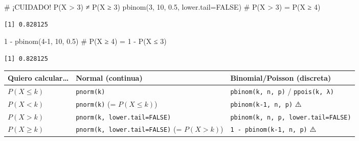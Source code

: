 \documentclass[
  letterpaper,
  DIV=11,
  numbers=noendperiod]{scrartcl}
\newenvironment{Shaded}{\begin{snugshade}}{\end{snugshade}}
\newcommand{\AttributeTok}[1]{\textcolor[rgb]{0.40,0.45,0.13}{#1}}
\newcommand{\CommentTok}[1]{\textcolor[rgb]{0.37,0.37,0.37}{#1}}
\newcommand{\ConstantTok}[1]{\textcolor[rgb]{0.56,0.35,0.01}{#1}}
\newcommand{\DecValTok}[1]{\textcolor[rgb]{0.68,0.00,0.00}{#1}}
\newcommand{\FloatTok}[1]{\textcolor[rgb]{0.68,0.00,0.00}{#1}}
\newcommand{\FunctionTok}[1]{\textcolor[rgb]{0.28,0.35,0.67}{#1}}
\newcommand{\NormalTok}[1]{\textcolor[rgb]{0.00,0.23,0.31}{#1}}
\newcommand{\SpecialCharTok}[1]{\textcolor[rgb]{0.37,0.37,0.37}{#1}}
\newcounter{none} %
\begin{document}
\begin{Shaded}
\begin{Highlighting}[]
\CommentTok{\# ¡CUIDADO! P(X \textgreater{} 3) ≠ P(X ≥ 3)}
\FunctionTok{pbinom}\NormalTok{(}\DecValTok{3}\NormalTok{, }\DecValTok{10}\NormalTok{, }\FloatTok{0.5}\NormalTok{, }\AttributeTok{lower.tail=}\ConstantTok{FALSE}\NormalTok{)  }\CommentTok{\# P(X \textgreater{} 3) = P(X ≥ 4)}
\end{Highlighting}
\end{Shaded}

\begin{verbatim}
[1] 0.828125
\end{verbatim}

\begin{Shaded}
\begin{Highlighting}[]
\DecValTok{1} \SpecialCharTok{{-}} \FunctionTok{pbinom}\NormalTok{(}\DecValTok{4{-}1}\NormalTok{, }\DecValTok{10}\NormalTok{, }\FloatTok{0.5}\NormalTok{)              }\CommentTok{\# P(X ≥ 4) = 1 {-} P(X ≤ 3)}
\end{Highlighting}
\end{Shaded}

\begin{verbatim}
[1] 0.828125
\end{verbatim}

{\def\LTcaptype{none} %
\begin{longtable}[]{@{}
  >{\raggedright\arraybackslash}p{}
  >{\raggedright\arraybackslash}p{}
  >{\raggedright\arraybackslash}p{}@{}}
\toprule\noalign{}
\begin{minipage}[b]{\linewidth}\raggedright
Quiero calcular\ldots{}
\end{minipage} & \begin{minipage}[b]{\linewidth}\raggedright
Normal (continua)
\end{minipage} & \begin{minipage}[b]{\linewidth}\raggedright
Binomial/Poisson (discreta)
\end{minipage} \\
\midrule\noalign{}
\endhead
\bottomrule\noalign{}
\endlastfoot
\(P(X \leq k)\) & \texttt{pnorm(k)} & \texttt{pbinom(k,\ n,\ p)} /
\texttt{ppois(k,\ λ)} \\
\(P(X < k)\) & \texttt{pnorm(k)} (= \(P(X \leq k)\)) &
\texttt{pbinom(k-1,\ n,\ p)} ⚠️ \\
\(P(X > k)\) & \texttt{pnorm(k,\ lower.tail=FALSE)} &
\texttt{pbinom(k,\ n,\ p,\ lower.tail=FALSE)} \\
\(P(X \geq k)\) & \texttt{pnorm(k,\ lower.tail=FALSE)} (= \(P(X > k)\))
& \texttt{1\ -\ pbinom(k-1,\ n,\ p)} ⚠️ \\
\end{longtable}
}
\end{document}
